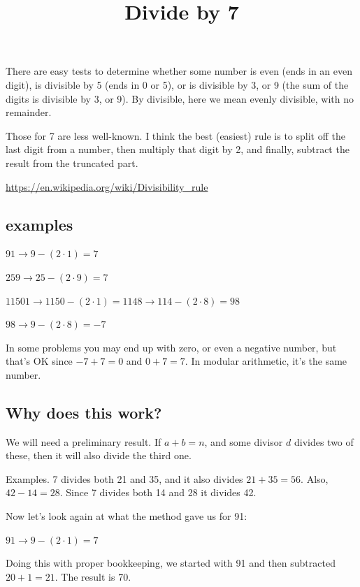 \documentclass[11pt, oneside]{article}
\title{Divide by 7}
\date{}
\begin{document}
\maketitle
\Large


There are easy tests to determine whether some number is even (ends in an even digit), is divisible by 5 (ends in 0 or 5), or is divisible by 3, or 9 (the sum of the digits is divisible by 3, or 9).  By divisible, here we mean evenly divisible, with no remainder.

Those for 7 are less well-known.  I think the best (easiest) rule is to split off the last digit from a number, then multiply that digit by 2, and finally, subtract the result from the truncated part.

\url{https://en.wikipedia.org/wiki/Divisibility_rule}

\subsection*{examples}

$91 \rightarrow 9 - (2 \cdot 1) = 7$

$259 \rightarrow 25 - (2 \cdot 9) = 7$

$11501 \rightarrow 1150 - (2 \cdot 1) = 1148 \rightarrow 114 - (2 \cdot 8) = 98$

$98 \rightarrow 9 - (2 \cdot 8) = -7$

In some problems you may end up with zero, or even a negative number, but that's OK since $-7 + 7 = 0$ and $0 + 7 = 7$.  In modular arithmetic, it's the same number.

\subsection*{Why does this work?}

We will need a preliminary result.  If $a + b = n$, and some divisor $d$ divides two of these, then it will also divide the third one.

Examples.  7 divides both 21 and 35, and it also divides $21 + 35 = 56$. Also, $42 - 14 = 28$.  Since 7 divides both 14 and 28 it divides 42.

Now let's look again at what the method gave us for 91:

$91 \rightarrow 9 - (2 \cdot 1) = 7$

Doing this with proper bookkeeping, we started with 91 and then subtracted $20 + 1 = 21$.  The result is 70.
\end{document}
